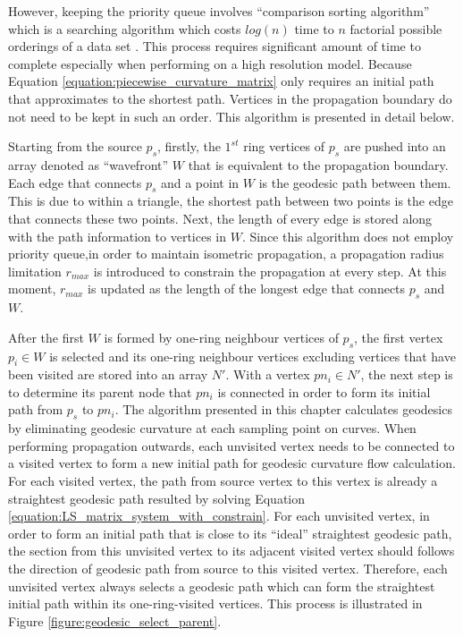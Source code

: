 However, keeping the priority queue involves ``comparison sorting algorithm'' which is a searching algorithm which costs $log(n)$ time to $n$ factorial possible orderings of a data set . This process requires significant amount of time to complete especially when performing on a high resolution model. Because Equation \ref{equation:piecewise_curvature_matrix} only requires an initial path that approximates to the shortest path. Vertices in the propagation boundary do not need to be kept in such an order. This algorithm is presented in detail below.

Starting from the source $p_{s}$, firstly, the $1^{st}$ ring vertices of $p_{s}$ are pushed into an array denoted as ``wavefront'' $W$ that is equivalent to the propagation boundary. Each edge that connects $p_{s}$ and a point in $W$ is the geodesic path between them. This is due to within a triangle, the shortest path between two points is the edge that connects these two points. Next, the length of every edge is stored along with the path information to vertices in $W$. Since this algorithm does not employ priority queue,in order to maintain isometric propagation, a propagation radius limitation $r_{max}$ is introduced to constrain the propagation at every step. At this moment, $r_{max}$ is updated as the length of the longest edge that connects $p_{s}$ and $W$. 

After the first $W$ is formed by one-ring neighbour vertices of $p_{s}$, the first vertex $p_{i} \in W$ is selected and its one-ring neighbour vertices excluding vertices that have been visited are stored into an array $N'$. With a vertex $pn_{i} \in N'$, the next step is to determine its parent node that $pn_{i}$ is connected in order to form its initial path from $p_{s}$ to $pn_{i}$. The algorithm presented in this chapter calculates geodesics by eliminating geodesic curvature at each sampling point on curves. When performing propagation outwards, each unvisited vertex needs to be connected to a visited vertex to form a new initial path for geodesic curvature flow calculation. For each visited vertex, the path from source vertex to this vertex is already a straightest geodesic path resulted by solving Equation \ref{equation:LS_matrix_system_with_constrain}. For each unvisited vertex, in order to form an initial path that is close to its ``ideal'' straightest geodesic path, the section from this unvisited vertex to its adjacent visited vertex should follows the direction of geodesic path from source to this visited vertex. Therefore, each unvisited vertex always selects a geodesic path which can form the straightest initial path within its one-ring-visited vertices. This process is illustrated in Figure \ref{figure:geodesic_select_parent}.


